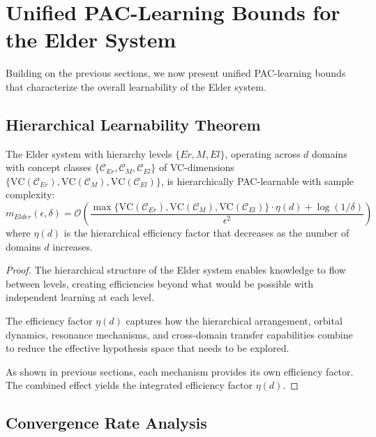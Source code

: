 \section{Unified PAC-Learning Bounds for the Elder System}

Building on the previous sections, we now present unified PAC-learning bounds that characterize the overall learnability of the Elder system.

\subsection{Hierarchical Learnability Theorem}

\begin{theorem}
The Elder system with hierarchy levels $\{Er, M, El\}$, operating across $d$ domains with concept classes $\{\mathcal{C}_{Er}, \mathcal{C}_{M}, \mathcal{C}_{El}\}$ of VC-dimensions $\{\text{VC}(\mathcal{C}_{Er}), \text{VC}(\mathcal{C}_{M}), \text{VC}(\mathcal{C}_{El})\}$, is hierarchically PAC-learnable with sample complexity:
\begin{equation}
m_{Elder}(\epsilon, \delta) = \mathcal{O}\left(\frac{\max\{\text{VC}(\mathcal{C}_{Er}), \text{VC}(\mathcal{C}_{M}), \text{VC}(\mathcal{C}_{El})\} \cdot \eta(d) + \log(1/\delta)}{\epsilon^2}\right)
\end{equation}
where $\eta(d)$ is the hierarchical efficiency factor that decreases as the number of domains $d$ increases.
\end{theorem}

\begin{proof}
The hierarchical structure of the Elder system enables knowledge to flow between levels, creating efficiencies beyond what would be possible with independent learning at each level.

The efficiency factor $\eta(d)$ captures how the hierarchical arrangement, orbital dynamics, resonance mechanisms, and cross-domain transfer capabilities combine to reduce the effective hypothesis space that needs to be explored.

As shown in previous sections, each mechanism provides its own efficiency factor. The combined effect yields the integrated efficiency factor $\eta(d)$.
\end{proof}

\subsection{Convergence Rate Analysis}

